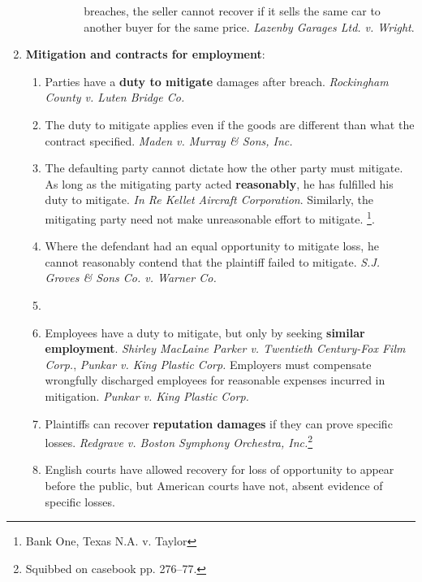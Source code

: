 \begin{enumerate}
\begin{enumerate}
\begin{enumerate}
\begin{enumerate}
                breaches, the seller cannot recover if it sells the same car 
                to another buyer for the same price. \emph{Lazenby Garages 
                Ltd. v. Wright}.
            \end{enumerate}
        \end{enumerate}
    \end{enumerate}
    \item \textbf{Mitigation and contracts for employment}:
    \begin{enumerate}
        \item Parties have a \textbf{duty to mitigate} damages after breach. 
        \emph{Rockingham County v. Luten Bridge Co.}
        \item The duty to mitigate applies even if the goods are different 
        than what the contract specified. \emph{Maden v. Murray \& Sons, Inc.}
        \item The defaulting party cannot dictate how the other party must 
        mitigate. As long as the mitigating party acted \textbf{reasonably}, 
        he has fulfilled his duty to mitigate. \emph{In Re Kellet Aircraft 
        Corporation}. Similarly, the mitigating party need not make 
        unreasonable effort to mitigate. \footnote{Bank One, Texas N.A. v. 
        Taylor}.
        \item Where the defendant had an equal opportunity to mitigate loss, 
        he cannot reasonably contend that the plaintiff failed to mitigate. 
        \emph{S.J. Groves \& Sons Co. v. Warner Co.}
        \item %
        \item Employees have a duty to mitigate, but only by seeking 
        \textbf{similar employment}. \emph{Shirley MacLaine Parker v.  
        Twentieth Century-Fox Film Corp.}, \emph{Punkar v. King Plastic 
        Corp.} Employers must compensate wrongfully discharged employees for 
        reasonable expenses incurred in mitigation. \emph{Punkar v. King 
        Plastic Corp.}
        \item Plaintiffs can recover \textbf{reputation damages} if they can 
        prove specific losses. \emph{Redgrave v. Boston Symphony Orchestra, 
        Inc.}\footnote{Squibbed on casebook pp. 276--77.}
        \item English courts have allowed recovery for loss of opportunity to 
        appear before the public, but American courts have not, absent 
        evidence of specific losses.
    \end{enumerate}

\end{enumerate}
